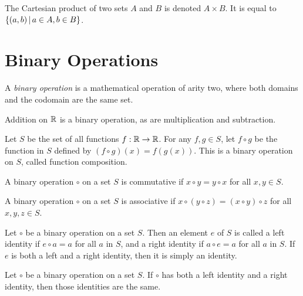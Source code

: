 \begin{defn}\label{cartesian-product}
    The Cartesian product of two sets $A$ and $B$ is denoted $A \times B$. It is equal to $\left\{\left(a, b\right) \,\middle|\, a \in A, b \in B \right\}$.
\end{defn}

\section{Binary Operations}

\begin{defn}
    A \emph{binary operation} is a mathematical operation of arity two, where both domains and the codomain are the same set.
\end{defn}

\begin{exmp}
    Addition on $\mathbb{R}$ is a binary operation, as are multiplication and subtraction.
\end{exmp}

\begin{exmp}
    Let $S$ be the set of all functions $f : \mathbb{R} \to \mathbb{R}$. For any $f, g \in S$, let $f \circ g$ be the function in $S$ defined by $(f \circ g)(x) = f(g(x))$. This is a binary operation on $S$, called function composition.
\end{exmp}

\begin{defn}
    A binary operation $\circ$ on a set $S$ is commutative if $x \circ y = y \circ x$ for all $x, y \in S$.
\end{defn}

\begin{defn}
    A binary operation $\circ$ on a set $S$ is associative if $x \circ (y \circ z) = (x \circ y) \circ z$ for all $x, y, z \in S$.
\end{defn}

\begin{defn}\label{identity}
    Let $\circ$ be a binary operation on a set $S$. Then an element $e$ of $S$ is called a left identity if $e \circ a = a$ for all $a$ in $S$, and a right identity if $a \circ e = a$ for all $a$ in $S$. If $e$ is both a left and a right identity, then it is simply an identity.
\end{defn}

\begin{thm}
    Let $\circ$ be a binary operation on a set $S$. If $\circ$ has both a left identity and a right identity, then those identities are the same.
\end{thm}

